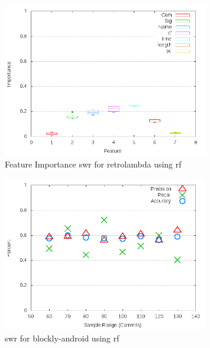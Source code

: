 \begin{figure}[!t]
\centering
\includegraphics[width=0.8\textwidth]{images/rf/test_1/retrolambda_importance.png}
\caption{Feature Importance \gls{swr} for retrolambda using \gls{rf}}
\label{fig:test_1_retrolambda_rf_importance}
\end{figure}

\begin{figure}[!t]
\centering
\includegraphics[width=0.8\textwidth]{images/rf/test_1/blockly-android_sample_range.png}
\caption{\gls{swr} for blockly-android using \gls{rf}}
\label{fig:test_1_blockly-android_rf}
\end{figure}

